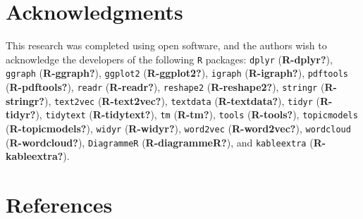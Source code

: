 \documentclass[]{elsarticle} %
\begin{document}
\hypertarget{acknowledgments}{%
\section{Acknowledgments}\label{acknowledgments}}

This research was completed using open software, and the authors wish to
acknowledge the developers of the following \texttt{R} packages:
\texttt{dplyr} (\textbf{R-dplyr?}), \texttt{ggraph}
(\textbf{R-ggraph?}), \texttt{ggplot2} (\textbf{R-ggplot2?}),
\texttt{igraph} (\textbf{R-igraph?}), \texttt{pdftools}
(\textbf{R-pdftools?}), \texttt{readr} (\textbf{R-readr?}),
\texttt{reshape2} (\textbf{R-reshape2?}), \texttt{stringr}
(\textbf{R-stringr?}), \texttt{text2vec} (\textbf{R-text2vec?}),
\texttt{textdata} (\textbf{R-textdata?}), \texttt{tidyr}
(\textbf{R-tidyr?}), \texttt{tidytext} (\textbf{R-tidytext?}),
\texttt{tm} (\textbf{R-tm?}), \texttt{tools} (\textbf{R-tools?}),
\texttt{topicmodels} (\textbf{R-topicmodels?}), \texttt{widyr}
(\textbf{R-widyr?}), \texttt{word2vec} (\textbf{R-word2vec?}),
\texttt{wordcloud} (\textbf{R-wordcloud?}), \texttt{DiagrammeR}
(\textbf{R-diagrammeR?}), and \texttt{kableextra}
(\textbf{R-kableextra?}).

\hypertarget{references}{%
\section*{References}\label{references}}
\end{document}
